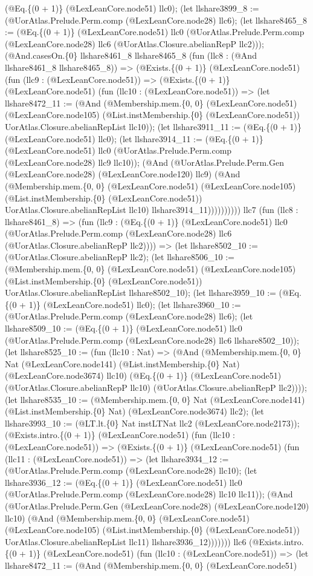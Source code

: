 \documentclass[11pt]{article}
\begin{document}
(@Eq.\{(0 + 1)\} (@LexLeanCore.node51) llc0); (let llshare3899\_8 := (@UorAtlas.Prelude.Perm.comp (@LexLeanCore.node28) llc6); (let llshare8465\_8 := (@Eq.\{(0 + 1)\} (@LexLeanCore.node51) llc0 (@UorAtlas.Prelude.Perm.comp (@LexLeanCore.node28) llc6 (@UorAtlas.Closure.abelianRepP llc2))); (@And.casesOn.\{0\} llshare8461\_8 llshare8465\_8 (fun (llc8 : (@And llshare8461\_8 llshare8465\_8)) => (@Exists.\{(0 + 1)\} (@LexLeanCore.node51) (fun (llc9 : (@LexLeanCore.node51)) => (@Exists.\{(0 + 1)\} (@LexLeanCore.node51) (fun (llc10 : (@LexLeanCore.node51)) => (let llshare8472\_11 := (@And (@Membership.mem.\{0, 0\} (@LexLeanCore.node51) (@LexLeanCore.node105) (@List.instMembership.\{0\} (@LexLeanCore.node51)) UorAtlas.Closure.abelianRepList llc10)); (let llshare3911\_11 := (@Eq.\{(0 + 1)\} (@LexLeanCore.node51) llc0); (let llshare3914\_11 := (@Eq.\{(0 + 1)\} (@LexLeanCore.node51) llc0 (@UorAtlas.Prelude.Perm.comp (@LexLeanCore.node28) llc9 llc10)); (@And (@UorAtlas.Prelude.Perm.Gen (@LexLeanCore.node28) (@LexLeanCore.node120) llc9) (@And (@Membership.mem.\{0, 0\} (@LexLeanCore.node51) (@LexLeanCore.node105) (@List.instMembership.\{0\} (@LexLeanCore.node51)) UorAtlas.Closure.abelianRepList llc10) llshare3914\_11)))))))))) llc7 (fun (llc8 : llshare8461\_8) => (fun (llc9 : (@Eq.\{(0 + 1)\} (@LexLeanCore.node51) llc0 (@UorAtlas.Prelude.Perm.comp (@LexLeanCore.node28) llc6 (@UorAtlas.Closure.abelianRepP llc2)))) => (let llshare8502\_10 := (@UorAtlas.Closure.abelianRepP llc2); (let llshare8506\_10 := (@Membership.mem.\{0, 0\} (@LexLeanCore.node51) (@LexLeanCore.node105) (@List.instMembership.\{0\} (@LexLeanCore.node51)) UorAtlas.Closure.abelianRepList llshare8502\_10); (let llshare3959\_10 := (@Eq.\{(0 + 1)\} (@LexLeanCore.node51) llc0); (let llshare3960\_10 := (@UorAtlas.Prelude.Perm.comp (@LexLeanCore.node28) llc6); (let llshare8509\_10 := (@Eq.\{(0 + 1)\} (@LexLeanCore.node51) llc0 (@UorAtlas.Prelude.Perm.comp (@LexLeanCore.node28) llc6 llshare8502\_10)); (let llshare8525\_10 := (fun (llc10 : Nat) => (@And (@Membership.mem.\{0, 0\} Nat (@LexLeanCore.node141) (@List.instMembership.\{0\} Nat) (@LexLeanCore.node3674) llc10) (@Eq.\{(0 + 1)\} (@LexLeanCore.node51) (@UorAtlas.Closure.abelianRepP llc10) (@UorAtlas.Closure.abelianRepP llc2)))); (let llshare8535\_10 := (@Membership.mem.\{0, 0\} Nat (@LexLeanCore.node141) (@List.instMembership.\{0\} Nat) (@LexLeanCore.node3674) llc2); (let llshare3993\_10 := (@LT.lt.\{0\} Nat instLTNat llc2 (@LexLeanCore.node2173)); (@Exists.intro.\{(0 + 1)\} (@LexLeanCore.node51) (fun (llc10 : (@LexLeanCore.node51)) => (@Exists.\{(0 + 1)\} (@LexLeanCore.node51) (fun (llc11 : (@LexLeanCore.node51)) => (let llshare3934\_12 := (@UorAtlas.Prelude.Perm.comp (@LexLeanCore.node28) llc10); (let llshare3936\_12 := (@Eq.\{(0 + 1)\} (@LexLeanCore.node51) llc0 (@UorAtlas.Prelude.Perm.comp (@LexLeanCore.node28) llc10 llc11)); (@And (@UorAtlas.Prelude.Perm.Gen (@LexLeanCore.node28) (@LexLeanCore.node120) llc10) (@And (@Membership.mem.\{0, 0\} (@LexLeanCore.node51) (@LexLeanCore.node105) (@List.instMembership.\{0\} (@LexLeanCore.node51)) UorAtlas.Closure.abelianRepList llc11) llshare3936\_12))))))) llc6 (@Exists.intro.\{(0 + 1)\} (@LexLeanCore.node51) (fun (llc10 : (@LexLeanCore.node51)) => (let llshare8472\_11 := (@And (@Membership.mem.\{0, 0\} (@LexLeanCore.node51) 
\end{document}
